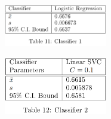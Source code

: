 \documentclass[11pt]{article}
\begin{document}

\begin{figure}[H]
	\centering
	\includegraphics[width = 0.4\textwidth]{c1s.png}
	\label{tbl:1st10000}
\end{figure} 


\begin{figure}[H]
	\centering
	\includegraphics[width = 0.4\textwidth]{c2s.png}
	\label{tbl:1nd10000}
\end{figure} 
\end{document}
